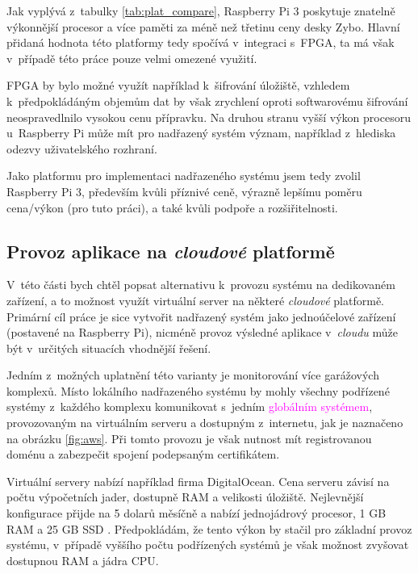 Jak vyplývá z~tabulky \ref{tab:plat_compare}, Raspberry Pi 3 poskytuje znatelně výkonnější procesor a více paměti za méně než třetinu ceny desky Zybo. Hlavní přidaná hodnota této platformy tedy spočívá v~integraci s~FPGA, ta má však v~případě této práce pouze velmi omezené využití. 

FPGA by bylo možné využít například k~šifrování úložiště, vzhledem k~předpokládáným objemům dat by však zrychlení oproti softwarovému šifrování neospravedlnilo vysokou cenu přípravku. Na druhou stranu vyšší výkon procesoru u~Raspberry Pi může mít pro nadřazený systém význam, například z~hlediska odezvy uživatelského rozhraní.

Jako platformu pro implementaci nadřazeného systému jsem tedy zvolil Raspberry Pi 3, především kvůli příznivé ceně, výrazně lepšímu poměru cena/výkon (pro tuto práci), a také kvůli podpoře a rozšiřitelnosti.

\subsection{Provoz aplikace na \textit{cloudové} platformě}
\label{sec:an_cloud}

V~této části bych chtěl popsat alternativu k~provozu systému na dedikovaném zařízení, a to možnost využít virtuální server na některé \textit{cloudové} platformě. Primární cíl práce je sice vytvořit nadřazený systém jako jednoúčelové zařízení (postavené na Raspberry Pi), nicméně provoz výsledné aplikace v~\textit{cloudu} může být v~určitých situacích vhodnější řešení.

Jedním z~možných uplatnění této varianty je monitorování více garážových komplexů. Místo lokálního nadřazeného systému by mohly všechny \textcolor{blue2}{podřízené systémy} z~každého komplexu komunikovat s~jedním \textcolor{magenta}{globálním systémem}, provozovaným na virtuálním serveru a dostupným z~internetu, jak je naznačeno na obrázku \ref{fig:aws}. Při tomto provozu je však nutnost mít registrovanou doménu a zabezpečit spojení podepsaným certifikátem.

Virtuální servery nabízí například firma DigitalOcean. Cena serveru závisí na počtu výpočetních jader, dostupně RAM a velikosti úložiště. Nejlevnější konfigurace přijde na 5 dolarů měsíčně a nabízí jednojádrový procesor, 1 GB RAM a 25 GB SSD \cite{digi_pricing}. Předpokládám, že tento výkon by stačil pro základní provoz systému, v~případě vyššího počtu podřízených systémů je však možnost zvyšovat dostupnou RAM a jádra CPU. 

